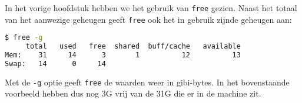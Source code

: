 In het vorige hoofdstuk hebben we het gebruik van \texttt{free} gezien. Naast het totaal van het aanwezige geheugen geeft \texttt{free} ook het in gebruik zijnde geheugen aan:
\begin{lstlisting}[language=bash]
$ free -g
     total   used   free  shared  buff/cache   available
Mem:    31     14      3       1          12          13
Swap:   14      0     14
\end{lstlisting}
Met de \texttt{-g} optie geeft \texttt{free} de waarden weer in gibi-bytes. In het bovenstaande voorbeeld hebben dus nog 3G vrij van de 31G die er in de machine zit.
